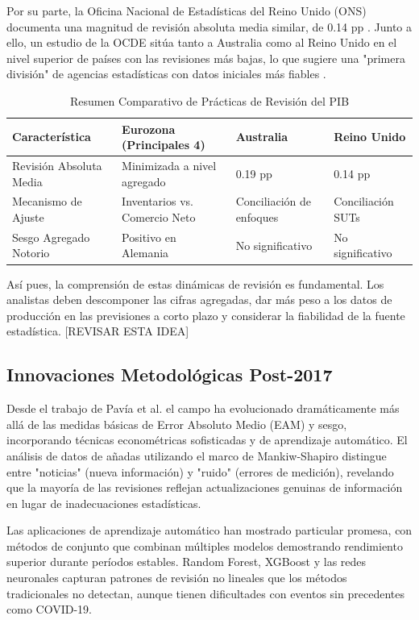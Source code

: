 \documentclass{article}
\begin{document}
Por su parte, la Oficina Nacional de Estadísticas del Reino Unido (ONS) documenta una magnitud de revisión absoluta media similar, de 0.14 pp \cite{ons_bluebook_2022}. Junto a ello, un estudio de la OCDE sitúa tanto a Australia como al Reino Unido en el nivel superior de países con las revisiones más bajas, lo que sugiere una "primera división" de agencias estadísticas con datos iniciales más fiables \cite{oecd_revisions}.

\begin{table}[h!]
    \centering
    \caption{Resumen Comparativo de Prácticas de Revisión del PIB}
    \label{tab:revision_summary}
    \begin{tabular}{llll}
        \toprule
        \textbf{Característica} & \textbf{Eurozona (Principales 4)} & \textbf{Australia} & \textbf{Reino Unido} \\
        \midrule
        Revisión Absoluta Media & Minimizada a nivel agregado & 0.19 pp & 0.14 pp \\
        Mecanismo de Ajuste & Inventarios vs. Comercio Neto & Conciliación de enfoques & Conciliación SUTs \\
        Sesgo Agregado Notorio & Positivo en Alemania & No significativo & No significativo \\
        \bottomrule
    \end{tabular}
\end{table}

Así pues, la comprensión de estas dinámicas de revisión es fundamental. Los analistas deben descomponer las cifras agregadas, dar más peso a los datos de producción en las previsiones a corto plazo y considerar la fiabilidad de la fuente estadística.
[REVISAR ESTA IDEA]

\subsection{Innovaciones Metodológicas Post-2017}

Desde el trabajo de Pavía et al. el campo ha evolucionado dramáticamente más allá de las medidas básicas de Error Absoluto Medio (EAM) y sesgo, incorporando técnicas econométricas sofisticadas y de aprendizaje automático. El análisis de datos de añadas utilizando el marco de Mankiw-Shapiro distingue entre "noticias" (nueva información) y "ruido" (errores de medición), revelando que la mayoría de las revisiones reflejan actualizaciones genuinas de información en lugar de inadecuaciones estadísticas.

Las aplicaciones de aprendizaje automático han mostrado particular promesa, con métodos de conjunto que combinan múltiples modelos demostrando rendimiento superior durante períodos estables. Random Forest, XGBoost y las redes neuronales capturan patrones de revisión no lineales que los métodos tradicionales no detectan, aunque tienen dificultades con eventos sin precedentes como COVID-19.
\end{document}
